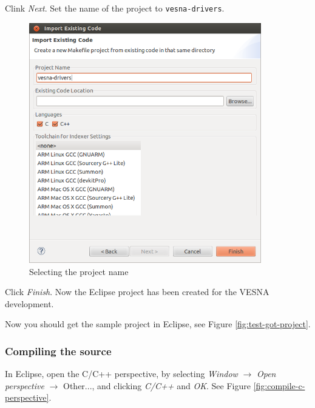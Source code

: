 \documentclass[a4paper, 10pt]{article}
\begin{document}
Clink \emph{Next}.
Set the name of the project to \verb+vesna-drivers+.

    \begin{figure}[H]
    \centering
        \includegraphics[width=0.9\textwidth]{./install-guide-linux-images/test-project-name.png}
        \caption{Selecting the project name}
        \label{fig:test-project-name}
    \end{figure}

Click \emph{Finish}.
Now the Eclipse project has been created for the VESNA development.


Now you should get the sample project in Eclipse, see
Figure \ref{fig:test-got-project}.

\subsubsection{Compiling the source}

In Eclipse, open the C/C++ perspective,  by selecting \emph{Window} $\rightarrow$
\emph{Open perspective} $\rightarrow$ Other...,
and clicking \emph{C/C++} and \emph{OK}.
See Figure \ref{fig:compile-c-perspective}.
\end{document}
